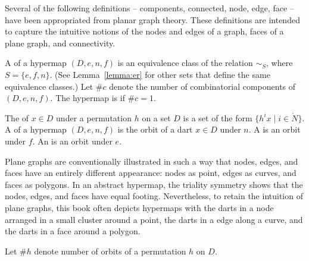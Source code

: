 Several of the following definitions -- components, connected, node,
edge, face -- have been appropriated from planar graph theory.  These
definitions are intended to capture the intuitive notions of the nodes
and edges of a graph, faces of a plane graph, and connectivity.

\begin{definition}
A  of a hypermap $(D,e,n,f)$ is an 
equivalence class of the relation $\sim_S$, where
$S=\{e,f,n\}$. 
(See Lemma~\ref{lemma:er} for other sets that define the same equivalence classes.)  
Let $\#c$ denote the
number of combinatorial components of $(D,e,n,f)$.  
The hypermap is  if
$\#c=1$.  %
%
%
%
%
\end{definition}





\begin{definition}
The  of $x\in D$ under a permutation $h$ on
a set $D$ is a set of the form $\{h^i x\mid i\in\ring{N}\}$.  A 
of a hypermap $(D,e,n,f)$ is the orbit of a dart $x\in D$ under $n$.  
A  is an orbit under $f$.  
An  is an
orbit under $e$.  %
%
%
\end{definition}

Plane graphs are conventionally illustrated in such a way that nodes,
edges, and faces have an entirely different appearance: nodes as
point, edges as curves, and faces as polygons.  In an abstract
hypermap, the triality symmetry shows that the nodes, edges, and faces
have equal footing.  Nevertheless, to retain the intuition of plane
graphs, this book  often depicts hypermaps with the darts in a node
arranged in a small cluster around a point, the darts in a edge along
a curve, and the darts in a face around a polygon.

Let $\#h$ denote
number of orbits of a permutation $h$ on $D$.  
%
%


